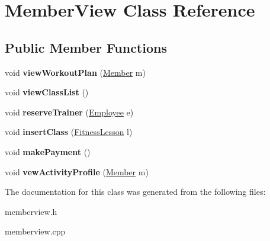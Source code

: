 \hypertarget{class_member_view}{\section{Member\-View Class Reference}
\label{class_member_view}
}
\subsection*{Public Member Functions}
\begin{DoxyCompactItemize}
\item 
\hypertarget{class_member_view_a4fc868363bf3c76ef7cf236d562e3ca8}{void {\bfseries view\-Workout\-Plan} (\hyperlink{class_member}{Member} m)}\label{class_member_view_a4fc868363bf3c76ef7cf236d562e3ca8}

\item 
\hypertarget{class_member_view_acc39fce53b81172f8c96e03c712405d3}{void {\bfseries view\-Class\-List} ()}\label{class_member_view_acc39fce53b81172f8c96e03c712405d3}

\item 
\hypertarget{class_member_view_a8f52d402f1df0b37afa7408e2c706bf5}{void {\bfseries reserve\-Trainer} (\hyperlink{class_employee}{Employee} e)}\label{class_member_view_a8f52d402f1df0b37afa7408e2c706bf5}

\item 
\hypertarget{class_member_view_a75164319c4ca544ab3b23bcbf7bfbc62}{void {\bfseries insert\-Class} (\hyperlink{class_fitness_lesson}{Fitness\-Lesson} l)}\label{class_member_view_a75164319c4ca544ab3b23bcbf7bfbc62}

\item 
\hypertarget{class_member_view_a866da036d8cd19b44da086f703150dd3}{void {\bfseries make\-Payment} ()}\label{class_member_view_a866da036d8cd19b44da086f703150dd3}

\item 
\hypertarget{class_member_view_ad9b2d42dfbec0ac20558bf2b5ad88d0e}{void {\bfseries vew\-Activity\-Profile} (\hyperlink{class_member}{Member} m)}\label{class_member_view_ad9b2d42dfbec0ac20558bf2b5ad88d0e}

\end{DoxyCompactItemize}


The documentation for this class was generated from the following files\-:\begin{DoxyCompactItemize}
\item 
memberview.\-h\item 
memberview.\-cpp\end{DoxyCompactItemize}
